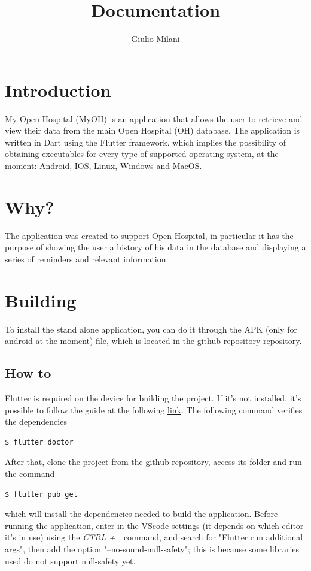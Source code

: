 \documentclass{ol-softwaremanual}
\title{Documentation}
\author{Giulio Milani}
\begin{document}
\maketitle

\tableofcontents
\listoflistings
\newpage

\section{Introduction}
\href{https://github.com/Giulio987/MyOH}{My Open Hospital} (MyOH) is an application that allows the user to retrieve and view their data from the main Open Hospital (OH) database. The application is written in Dart using the Flutter framework, which implies the possibility of obtaining executables for every type of supported operating system, at the moment: Android, IOS, Linux, Windows and MacOS.
\section{Why?}
The application was created to support Open Hospital, in particular it has the purpose of showing the user a history of his data in the database and displaying a series of reminders and relevant information

\section{Building}
 To install the stand alone application, you can do it through the APK (only for android at the moment) file, which is located in the github repository \href{https://github.com/Giulio987/MyOH/releases/tag/v1.0-beta0.1}{repository}.
\subsection{How to}
Flutter is required on the device for building the project. If it's not installed, it's possible to follow the guide at the following \href{https://flutter.dev/docs/get-started/install}{link}. The following command verifies the dependencies
\begin{lstlisting}[language=bash]
  $ flutter doctor
\end{lstlisting}
After that, clone the project from the github repository, access its folder and run the command 
\begin{lstlisting}[language=bash]
  $ flutter pub get
\end{lstlisting}
which will install the dependencies needed to build the application.
Before running the application, enter in the VScode settings (it depends on which editor it's in use) using the \textit{CTRL + ,} command, and search for "Flutter run additional args", then add the option "--no-sound-null-safety"; this is because some libraries used do not support null-safety yet.
\end{document}
